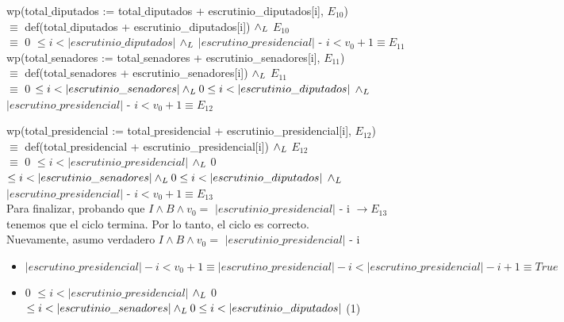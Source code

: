 \documentclass[10pt,a4paper]{article}
\begin{document}
\noindent wp(total$\_$diputados := total$\_$diputados + escrutinio\_diputados[i], $E_{10}$) \\

\noindent $\equiv$ def(total$\_$diputados + escrutinio\_diputados[i]) $\land _L$ $E_{10}$ \\

\noindent $\equiv$ 0 $\leq i < |escrutinio\_diputados|$ $\land _L$ $|escrutino\_presidencial|$  - $i < v_0 + 1 \equiv E_{11}$ \vspace{0.3cm}\\


\noindent wp(total$\_$senadores := total$\_$senadores + escrutinio\_senadores[i], $E_{11}$) \\

\noindent $\equiv$ def(total$\_$senadores + escrutinio\_senadores[i]) $\land _L$ $E_{11}$ \\

\noindent $\equiv$  0 $\leq i < |escrutinio\_senadores| \land _L 0 \leq i < |escrutinio\_diputados|$ $\land _L$ $|escrutino\_presidencial|$  - $i < v_0 + 1 \equiv E_{12} $ \vspace{0.3cm}\\

\newpage

\noindent wp(total$\_$presidencial := total$\_$presidencial + escrutinio\_presidencial[i], $E_{12}$) \\

\noindent $\equiv$ def(total$\_$presidencial + escrutinio\_presidencial[i]) $\land _L$ $E_{12}$ \\

\noindent $\equiv$   0 $\leq i < |escrutinio\_presidencial| $ $\land _L $ 0 $\leq i < |escrutinio\_senadores| \land _L 0 \leq i < |escrutinio\_diputados|$ $\land _L$ \\ $|escrutino\_presidencial|$  - $i < v_0 + 1 \equiv E_{13} $ \vspace{0.3cm}\\

\noindent Para finalizar, probando que $I \land B \land v_0 = $ $|escrutinio\_presidencial|$ - i $\rightarrow E_{13}$ tenemos que el ciclo termina. Por lo tanto, el ciclo es correcto. \\

\noindent Nuevamente, asumo verdadero $I \land B \land v_0 = $ $|escrutinio\_presidencial|$  - i

\begin{itemize}\setlength{\itemindent}{0.5cm}
	\item $|escrutino\_presidencial| - i < v_0 + 1  \equiv |escrutino\_presidencial| -  i < |escrutino\_presidencial| -  i + 1 \equiv True$
	\item  0 $\leq i < |escrutinio\_presidencial| $ $\land _L $ 0 $\leq i < |escrutinio\_senadores| \land _L 0 \leq i < |escrutinio\_diputados|$ (1)
\end{itemize}
\end{document}
